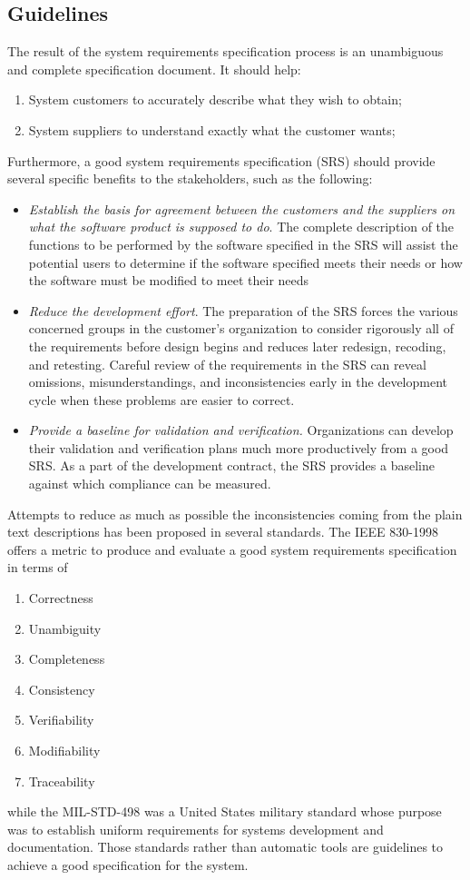\subsection{Guidelines}


The result of the system requirements specification process is an
unambiguous and complete specification document. It should help:
\begin{enumerate}[label=\alph*)]
\item System customers to accurately describe what they wish to obtain;
\item System suppliers to understand exactly what the customer wants;
\end{enumerate}
Furthermore, a good system requirements specification (SRS) should provide several specific benefits to the stakeholders, such as the following:
\begin{itemize}[label={--}]
\item \textit{Establish the basis for agreement between the customers and the suppliers on what the software
product is supposed to do}. The complete description of the functions to be performed by the software specified
in the SRS will assist the potential users to determine if the software specified meets their needs or
how the software must be modified to meet their needs
\item \textit{Reduce the development effort}. The preparation of the SRS forces the various concerned groups in
the customer’s organization to consider rigorously all of the requirements before design begins and
reduces later redesign, recoding, and retesting. Careful review of the requirements in the SRS can
reveal omissions, misunderstandings, and inconsistencies early in the development cycle when these
problems are easier to correct.
\item \textit{Provide a baseline for validation and verification.} Organizations can develop their validation and
verification plans much more productively from a good SRS. As a part of the development contract,
the SRS provides a baseline against which compliance can be measured.
\end{itemize}
\par Attempts to reduce as much as possible the inconsistencies coming from the plain text descriptions has been proposed in several standards. The IEEE 830-1998 \citep{ieee1998ieee} offers a metric to produce and evaluate a good system requirements specification in terms of 
\begin{enumerate}[label=\alph*)]
\item Correctness
\item Unambiguity
\item Completeness
\item Consistency
\item Verifiability
\item Modifiability
\item Traceability
\end{enumerate}
while the MIL-STD-498 \citep{united1994mil} was a United States military standard whose purpose was to establish uniform requirements for systems development and documentation. Those standards rather than automatic tools are guidelines to achieve a good specification for the system.

